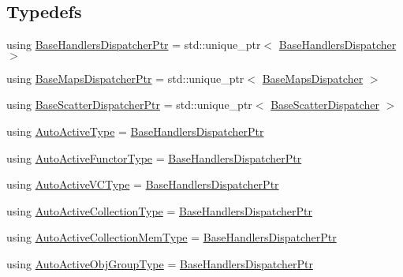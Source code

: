 \subsection*{Typedefs}
\begin{DoxyCompactItemize}
\item 
using \hyperlink{namespacevt_1_1auto__registry_a0166496b1137bbc1b20adfeb5e19cf0e}{Base\+Handlers\+Dispatcher\+Ptr} = std\+::unique\+\_\+ptr$<$ \hyperlink{structvt_1_1auto__registry_1_1_base_handlers_dispatcher}{Base\+Handlers\+Dispatcher} $>$
\item 
using \hyperlink{namespacevt_1_1auto__registry_aacf403872e2d1ae4d749738c02904c01}{Base\+Maps\+Dispatcher\+Ptr} = std\+::unique\+\_\+ptr$<$ \hyperlink{structvt_1_1auto__registry_1_1_base_maps_dispatcher}{Base\+Maps\+Dispatcher} $>$
\item 
using \hyperlink{namespacevt_1_1auto__registry_aba7be4c573c0f1361c024e4d3293a62a}{Base\+Scatter\+Dispatcher\+Ptr} = std\+::unique\+\_\+ptr$<$ \hyperlink{structvt_1_1auto__registry_1_1_base_scatter_dispatcher}{Base\+Scatter\+Dispatcher} $>$
\item 
using \hyperlink{namespacevt_1_1auto__registry_a2c91a60d4d3c0d80a563c3d4f54162eb}{Auto\+Active\+Type} = \hyperlink{namespacevt_1_1auto__registry_a0166496b1137bbc1b20adfeb5e19cf0e}{Base\+Handlers\+Dispatcher\+Ptr}
\item 
using \hyperlink{namespacevt_1_1auto__registry_a092979b3ed6cf9e21e6a5823fdaa0c12}{Auto\+Active\+Functor\+Type} = \hyperlink{namespacevt_1_1auto__registry_a0166496b1137bbc1b20adfeb5e19cf0e}{Base\+Handlers\+Dispatcher\+Ptr}
\item 
using \hyperlink{namespacevt_1_1auto__registry_a3e4aadbe33ef7af6d8b87f72876aee41}{Auto\+Active\+V\+C\+Type} = \hyperlink{namespacevt_1_1auto__registry_a0166496b1137bbc1b20adfeb5e19cf0e}{Base\+Handlers\+Dispatcher\+Ptr}
\item 
using \hyperlink{namespacevt_1_1auto__registry_a14267fe1eee84b3f2205aecac48cafe4}{Auto\+Active\+Collection\+Type} = \hyperlink{namespacevt_1_1auto__registry_a0166496b1137bbc1b20adfeb5e19cf0e}{Base\+Handlers\+Dispatcher\+Ptr}
\item 
using \hyperlink{namespacevt_1_1auto__registry_af5d102e15ae09e22dbc560f5b64ec758}{Auto\+Active\+Collection\+Mem\+Type} = \hyperlink{namespacevt_1_1auto__registry_a0166496b1137bbc1b20adfeb5e19cf0e}{Base\+Handlers\+Dispatcher\+Ptr}
\item 
using \hyperlink{namespacevt_1_1auto__registry_a4b369568c19084c562ddbeef6894a145}{Auto\+Active\+Obj\+Group\+Type} = \hyperlink{namespacevt_1_1auto__registry_a0166496b1137bbc1b20adfeb5e19cf0e}{Base\+Handlers\+Dispatcher\+Ptr}

\end{DoxyCompactItemize}
